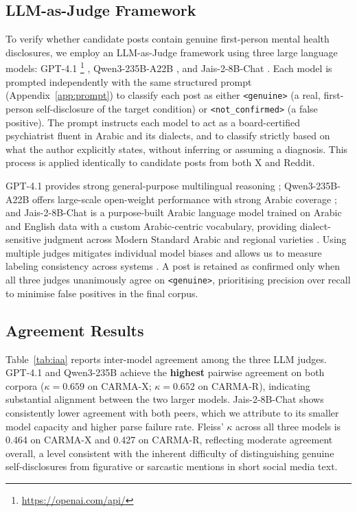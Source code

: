 \documentclass[11pt]{article}
\begin{document}
\subsection{LLM-as-Judge Framework}
\label{subsec:llm_judge}

To verify whether candidate posts contain genuine first-person mental
health disclosures, we employ an LLM-as-Judge framework
\cite{zheng2023judging} using three large language models: GPT-4.1
\footnote{\url{https://openai.com/api/}} \cite{achiam2023gpt},
Qwen3-235B-A22B \cite{qwen3technicalreport}, and Jais-2-8B-Chat
\cite{jais2_2025}. Each model is prompted independently with the same
structured prompt (Appendix~\ref{app:prompt}) to classify each post as
either \texttt{<genuine>} (a real, first-person self-disclosure of the
target condition) or \texttt{<not\_confirmed>} (a false positive). The
prompt instructs each model to act as a board-certified psychiatrist
fluent in Arabic and its dialects, and to classify strictly based on
what the author explicitly states, without inferring or assuming a
diagnosis. This process is applied identically to candidate posts from
both X and Reddit.

GPT-4.1 provides strong general-purpose multilingual reasoning
\cite{zhong2024agieval, moell2024comparing}; Qwen3-235B-A22B offers
large-scale open-weight performance with strong Arabic coverage
\cite{qwen3technicalreport}; and Jais-2-8B-Chat is a purpose-built
Arabic language model trained on Arabic and English data with a custom
Arabic-centric vocabulary, providing dialect-sensitive judgment across
Modern Standard Arabic and regional varieties \cite{jais2_2025}.
Using multiple judges mitigates individual model biases and allows us to
measure labeling consistency across systems \cite{zheng2023judging}.
A post is retained as confirmed only when all three judges unanimously
agree on \texttt{<genuine>}, prioritising precision over recall to
minimise false positives in the final corpus.

\subsection{Agreement Results}
\label{subsec:agreement}

Table~\ref{tab:iaa} reports inter-model agreement among the three LLM
judges. GPT-4.1 and Qwen3-235B achieve the \textbf{highest} pairwise
agreement on both corpora ($\kappa = 0.659$ on CARMA-X; $\kappa = 0.652$
on CARMA-R), indicating substantial alignment between the two larger
models. Jais-2-8B-Chat shows consistently lower agreement with both
peers, which we attribute to its smaller model capacity
\cite{wei2022emergent} and higher parse failure rate. Fleiss' $\kappa$
across all three models is 0.464 on CARMA-X and 0.427 on CARMA-R,
reflecting moderate agreement overall, a level consistent with the
inherent difficulty of distinguishing genuine self-disclosures from
figurative or sarcastic mentions in short social media text.
\end{document}
